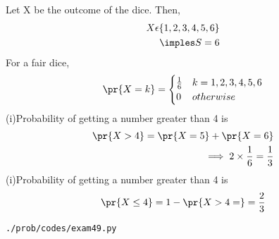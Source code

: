 Let X be the outcome of the dice. Then,
\begin{align}
X \epsilon \{1,2,3,4,5,6\}
\\
\imples S=6
\end{align}
For a fair dice,
\begin{align}
\pr{X=k}=\begin{cases}
        \frac{1}{6}& k=1,2,3,4,5,6\\
        0 & otherwise
        \end{cases}
\end{align}
(i)Probability of getting a number greater than 4 is
\begin{align}
\pr{X > 4}=\pr{X=5}+\pr{X=6}
 \\
\implies 2 \times \frac{1}{6}=\frac{1}{3}
\end{align}
(i)Probability of getting a number greater than 4 is
\begin{align}
\pr{X \leq 4}=1-\pr{X>4=}=\frac{2}{3}
\end{align}
\begin{lstlisting}
./prob/codes/exam49.py
\end{lstlisting}
